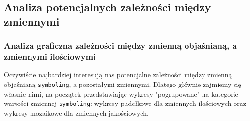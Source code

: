 \documentclass[12pt, a4paper]{article}\usepackage[]{graphicx}\usepackage[]{xcolor}
\begin{document}
\subsection{Analiza potencjalnych zależności między zmiennymi}
\subsubsection {Analiza graficzna zależności między zmienną objaśnianą, a zmiennymi ilościowymi}

Oczywiście najbardziej interesują nas potencjalne zależności między zmienną objaśnianą \texttt{symboling}, a pozostałymi zmiennymi. Dlatego głównie zajmiemy się właśnie nimi, na początek przedstawiając wykresy "pogrupowane" na kategorie wartości zmiennej \texttt{symboling}: wykresy pudełkowe dla zmiennych ilościowych oraz wykresy mozaikowe dla zmiennych jakościowych.
\end{document}
